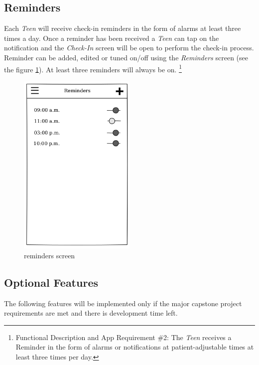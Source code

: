 \documentclass{article}
\begin{document}
\newpage

    \subsection{Reminders}

    Each \emph{Teen} will receive check-in reminders in the form of alarms at least three times a day. Once a reminder has been received a \emph{Teen} can tap on the notification and the \emph{Check-In} screen will be open to perform the check-in process.
    Reminder can be added, edited or tuned on/off  using the \emph{Reminders} screen (see the figure \ref{fig:screen_reminders}). At least three reminders will always be on.
    \footnote{Functional Description and App Requirement \#2: The \emph{Teen} receives a Reminder in the form of alarms or notifications at patient-adjustable times at least three times per day.}

    \begin{figure}[h]
        \centering
        \includegraphics[width=0.5\textwidth,height=\textheight,keepaspectratio]{reminders.png}
        \caption{reminders screen}
        \label{fig:screen_reminders}
    \end{figure}

\newpage

    \subsection{Optional Features}

    The following features will be implemented only if the major capstone project requirements are met and there is development time left.
\end{document}
